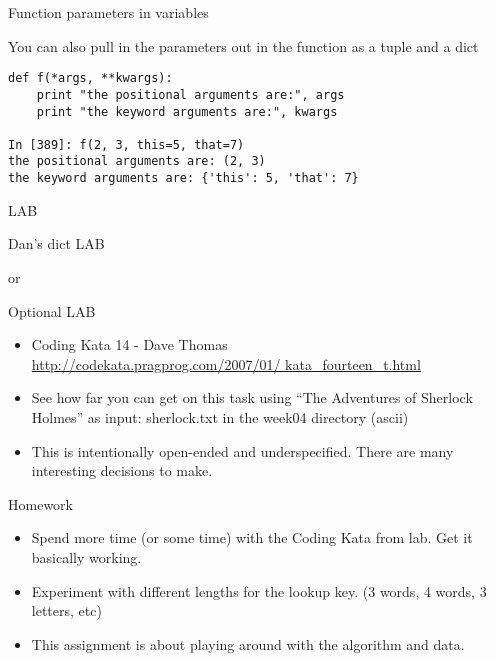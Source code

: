 \documentclass{beamer}
\begin{document}
\begin{frame}[fragile]{Function parameters in variables}

{\Large You can also pull in the parameters out in the function as a tuple and a dict
}
\begin{verbatim}
def f(*args, **kwargs):
    print "the positional arguments are:", args
    print "the keyword arguments are:", kwargs
 
In [389]: f(2, 3, this=5, that=7)
the positional arguments are: (2, 3)
the keyword arguments are: {'this': 5, 'that': 7}
\end{verbatim}

\end{frame} 

\begin{frame}{LAB}

{\LARGE Dan's dict LAB

\vfill
or

\vfill
Optional LAB
}

\begin{itemize}
  \item Coding Kata 14 - Dave Thomas \\
    \url{http://codekata.pragprog.com/2007/01/ kata_fourteen_t.html}
  \item See how far you can get on this task using “The Adventures of Sherlock Holmes” as input: sherlock.txt in the week04 directory (ascii)
  \item  This is intentionally open-ended and underspecified. There are many interesting decisions to make.
\end{itemize}

\end{frame}

\begin{frame}{Homework}

\begin{itemize}
  \item Spend more time (or some time) with the Coding Kata from lab. Get it basically working.
  \item Experiment with different lengths for the lookup key. (3 words, 4 words, 3 letters, etc)
  \item This assignment is about playing around with the algorithm and data.
\end{itemize}

\end{frame}
\end{document}
